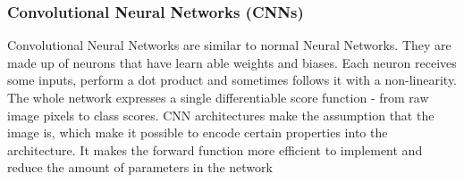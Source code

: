 \subsubsection*{Convolutional Neural Networks (CNNs)}

Convolutional Neural Networks are similar to normal Neural Networks. They are made up of neurons that have learn able weights and biases. Each neuron receives some inputs, perform a dot product and sometimes follows it with a non-linearity. The whole network expresses a single differentiable score function - from raw image pixels to class scores. CNN architectures make the assumption that the image is, which make it possible to encode certain properties into the architecture. It makes the forward function more efficient to implement and reduce the amount of parameters in the network     
